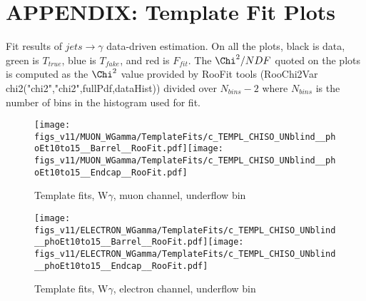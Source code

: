 \section{APPENDIX: Template Fit Plots}
\label{sec:TemplateFitPlots}

Fit results of $jets \rightarrow \gamma$ data-driven estimation. On all the plots, black is data, green is $T_{true}$, blue is $T_{fake}$, and red is $F_{fit}$. The $\Chi^2/{NDF}$ quoted on the plots is computed as the $\Chi^2$ value provided by RooFit tools (RooChi2Var chi2("chi2","chi2",fullPdf,dataHist)) divided over $N_{bins}-2$ where $N_{bins}$ is the number of bins in the histogram used for fit.
  

\begin{figure}[htb]
  \begin{center}
   \texttt{[image: figs\_v11/MUON\_WGamma/TemplateFits/c\_TEMPL\_CHISO\_UNblind\_\_phoEt10to15\_\_Barrel\_\_RooFit.pdf]}\texttt{[image: figs\_v11/MUON\_WGamma/TemplateFits/c\_TEMPL\_CHISO\_UNblind\_\_phoEt10to15\_\_Endcap\_\_RooFit.pdf]}\\
  \label{fig:templateFits_CHISO_MUON_0}
  \caption{Template fits, W$\gamma$, muon channel, underflow bin}
  \end{center}
\end{figure}

\begin{figure}[htb]
  \begin{center}
   \texttt{[image: figs\_v11/ELECTRON\_WGamma/TemplateFits/c\_TEMPL\_CHISO\_UNblind\_\_phoEt10to15\_\_Barrel\_\_RooFit.pdf]}\texttt{[image: figs\_v11/ELECTRON\_WGamma/TemplateFits/c\_TEMPL\_CHISO\_UNblind\_\_phoEt10to15\_\_Endcap\_\_RooFit.pdf]}\\
  \label{fig:templateFits_CHISO_ELECTRON_0}
  \caption{Template fits, W$\gamma$, electron channel, underflow bin}
  \end{center}
\end{figure}

